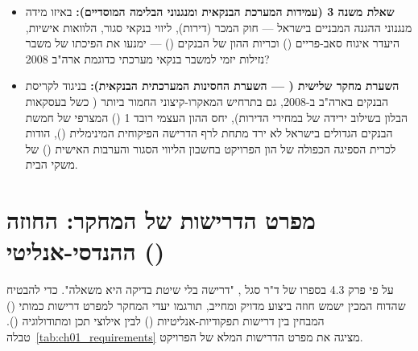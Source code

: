 \begin{itemize}[leftmargin=*, itemsep=4pt]
  \item \textbf{שאלת משנה 3 (עמידות המערכת הבנקאית ומנגנוני הבלימה המוסדיים):} באיזו מידה מנגנוני ההגנה המבניים בישראל --- חוק המכר (דירות), ליווי בנקאי סגור, הלוואות  אישיות, היעדר איגוח סאב-פריים () וכריות ההון של הבנקים () --- ימנעו את הפיכתו של משבר נזילות יזמי למשבר בנקאי מערכתי כדוגמת ארה"ב \num{2008}?
  \item \textbf{השערת מחקר שלישית ( --- השערת החסינות המערכתית הבנקאית):} בניגוד לקריסת הבנקים בארה"ב ב-\num{2008}, גם בתרחיש המאקרו-קיצוני החמור ביותר ( כשל בעסקאות הבלון בשילוב ירידה של  במחירי הדירות), יחס ההון העצמי רובד \num{1} () המצרפי של חמשת הבנקים הגדולים בישראל לא ירד מתחת לרף הדרישה הפיקוחית המינימלית (), הודות לכרית הספיגה הכפולה של הון הפרויקט בחשבון הליווי הסגור והערבות האישית () של משקי הבית.
\end{itemize}

\section{מפרט הדרישות של המחקר: החוזה ההנדסי-אנליטי ()}
\label{sec:ch01_requirements}

על פי פרק \num{4.3} בספרו של ד"ר סגל \cite{segal2026prep}, "דרישה בלי שיטת בדיקה היא משאלה". כדי להבטיח שהדוח המכין ישמש חוזה ביצוע מדויק ומחייב, תורגמו יעדי המחקר למפרט דרישות כמותי () המבחין בין דרישות תפקודיות-אנליטיות () לבין אילוצי תכן ומתודולוגיה (). טבלה~\ref{tab:ch01_requirements} מציגה את מפרט הדרישות המלא של הפרויקט.

